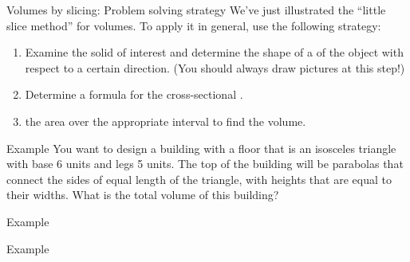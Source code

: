 \documentclass[presentation]{beamer}
\begin{document}
\begin{frame}[label={sec:org784bfe2}]{Volumes by slicing: Problem solving strategy}
We've just illustrated the ``little slice method'' for volumes. To apply it in general,
use the following strategy:
\begin{enumerate}
\item Examine the solid of interest and determine the shape of a
\uline{\hspace*{1in}} of the object with respect to a certain
direction. (You should always draw pictures at this step!)
\item Determine a formula for the cross-sectional \uline{\hspace*{1in}}.
\item \uline{\hspace*{1in}} the area over the appropriate interval to find the
volume.
\end{enumerate}
\end{frame}

\begin{frame}[label={sec:orgd9a4d23}]{Example}
You want to design a building with a floor that is an isosceles
triangle with base 6 units and legs 5 units.  The top of the building
will be parabolas that connect the sides of equal length of the
triangle, with heights that are equal to their widths.  What is the
total volume of this building?
\vspace{10in}
\end{frame}

\begin{frame}[label={sec:org4000f9e}]{Example}
\end{frame}

\begin{frame}[label={sec:org58cc827}]{Example}
\end{frame}
\end{document}
